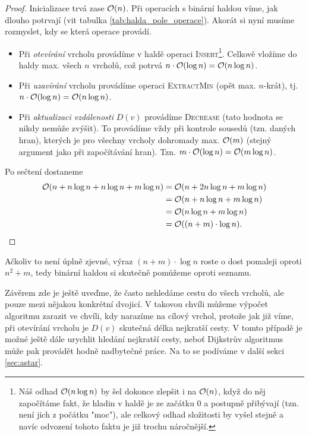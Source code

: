 \begin{proof}
    Inicializace trvá zase $\mathcal{O}(n)$. Při operacích s binární haldou víme, jak dlouho potrvají (vit tabulka \ref{tab:halda_pole_operace}). Akorát si nyní musíme rozmyslet, kdy se která operace provádí.
    \begin{itemize}
        \item Při \emph{otevírání} vrcholu provádíme v haldě operaci \textsc{Insert}\footnote{Náš odhad $\mathcal{O}(n\log{n})$ by šel dokonce zlepšit i na $\mathcal{O}(n)$, když do něj započítáme fakt, že hladin v haldě je ze začátku 0 a postupně přibývají (tzn. není jich z počátku "moc"), ale celkový odhad složitosti by vyšel stejně a navíc odvození tohoto faktu je již trochu náročnější.}. Celkově vložíme do haldy max. všech $n$ vrcholů, což potrvá $n\cdot\mathcal{O}(\log{n})=\mathcal{O}(n\log{n})$.
        \item Při \emph{uzavírání} vrcholu provádíme operaci \textsc{ExtractMin} (opět max. $n$-krát), tj. $n\cdot\mathcal{O}(\log{n})=\mathcal{O}(n\log{n})$.
        \item Při \emph{aktualizaci vzdálenosti} $D(v)$ provádíme \textsc{Decrease} (tato hodnota se nikdy nemůže zvýšit). To provádíme vždy při kontrole sousedů (tzn. daných hran), kterých je pro všechny vrcholy dohromady max. $\mathcal{O}(m)$ (stejný argument jako při započítávání hran). Tzn. $m\cdot\mathcal{O}(\log{n})=\mathcal{O}(m\log{n})$.
    \end{itemize}
    Po sečtení dostaneme
    \begin{align*}
        \mathcal{O}(n+n\log{n}+n\log{n}+m\log{n})&=\mathcal{O}(n+2n\log{n}+m\log{n})\\
        &=\mathcal{O}(n+n\log{n}+m\log{n})\\
        &=\mathcal{O}(n\log{n}+m\log{n})\\
        &=\mathcal{O}((n+m)\cdot\log{n}).
    \end{align*}
\end{proof}
Ačkoliv to není úplně zjevné, výraz $(n+m)\cdot\log{n}$ roste o dost pomaleji oproti $n^2+m$, tedy binární haldou si skutečně pomůžeme oproti seznamu.

Závěrem zde je ještě uveďme, že často nehledáme cestu do všech vrcholů, ale pouze mezi nějakou konkrétní dvojicí. V takovou chvíli můžeme výpočet algoritmu zarazit ve chvíli, kdy narazíme na cílový vrchol, protože jak již víme, při otevírání vrcholu je $D(v)$ skutečná délka nejkratší cesty. V tomto případě je možné ještě dále urychlit hledání nejkratší cesty, neboť Dijkstrův algoritmus může pak provádět hodně nadbytečné práce. Na to se podíváme v další sekci \ref{sec:astar}.